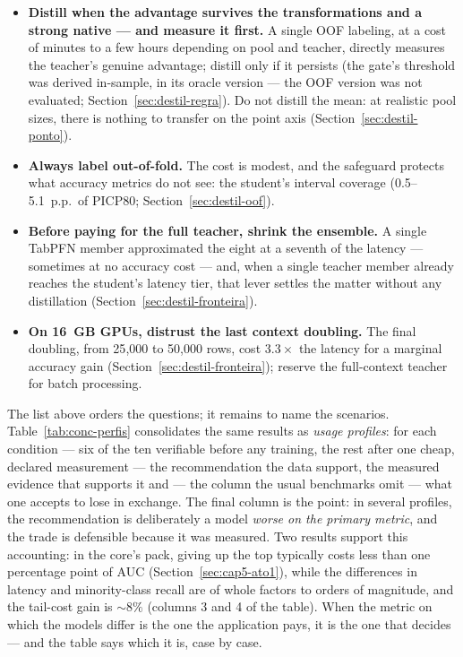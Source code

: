 \begin{itemize}
    on \texttt{wine\_quality}, it beat even the teacher (E1,
    Section~\ref{sec:destil-e1}); a quantile MLP covers the small,
    numeric datasets (Section~\ref{sec:destil-regra}).
  \item \textbf{Distill when the advantage survives the
    transformations and a strong native --- and measure it first.}
    A single OOF labeling, at a cost of minutes to a few hours
    depending on pool and teacher, directly measures
    the teacher's genuine advantage; distill only if it persists
    (the gate's threshold was derived in-sample, in its oracle
    version --- the OOF version was not evaluated;
    Section~\ref{sec:destil-regra}). Do not distill the mean: at
    realistic pool sizes, there is nothing to transfer on the point axis
    (Section~\ref{sec:destil-ponto}).
  \item \textbf{Always label out-of-fold.} The cost is modest, and
    the safeguard protects what accuracy metrics do not see: the
    student's interval coverage (0.5--5.1~p.p.\ of PICP80;
    Section~\ref{sec:destil-oof}).
  \item \textbf{Before paying for the full teacher, shrink the
    ensemble.} A single TabPFN member approximated the eight at a
    seventh of the latency --- sometimes at no accuracy cost ---
    and, when a single teacher member already reaches the student's
    latency tier, that lever settles the matter without any
    distillation (Section~\ref{sec:destil-fronteira}).
  \item \textbf{On 16~GB GPUs, distrust the last context
    doubling.} The final doubling, from 25{,}000 to 50{,}000 rows,
    cost $3.3\times$ the latency for a marginal accuracy gain
    (Section~\ref{sec:destil-fronteira}); reserve the full-context
    teacher for batch processing.
\end{itemize}

The list above orders the questions; it remains to name the
scenarios. Table~\ref{tab:conc-perfis} consolidates the same results
as \emph{usage profiles}: for each condition --- six of the ten
verifiable before any training, the rest after one cheap, declared
measurement --- the recommendation the data support, the measured
evidence
that supports it and --- the column the usual benchmarks omit ---
what one accepts to lose in exchange. The final column is the point:
in several profiles, the recommendation is deliberately a model
\emph{worse on the primary metric}, and the trade is defensible
because it was measured. Two results support this accounting: in the
core's pack, giving up the top typically costs less than one
percentage point of AUC (Section~\ref{sec:cap5-ato1}), while the
differences in latency
and minority-class recall are of
whole factors to orders of magnitude, and the tail-cost gain is
${\sim}8\%$ (columns 3 and 4 of the table).
When the metric on which the models differ is the one the
application pays, it is the one that decides --- and the table says
which it is, case by case.

